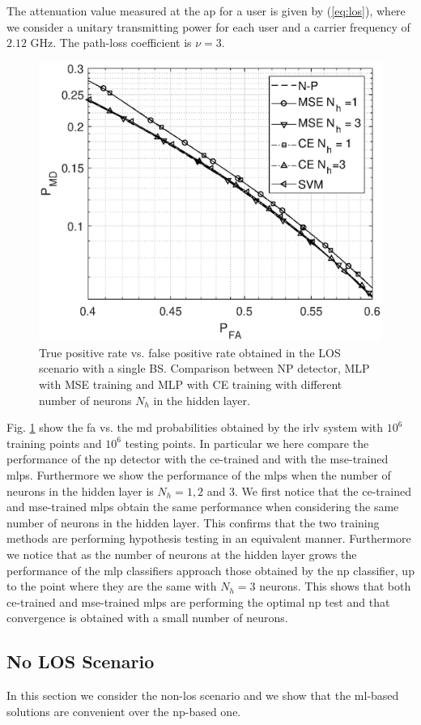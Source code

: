 \documentclass[draftcls,onecolumn,12pt]{IEEEtran}
\begin{document}
The attenuation value measured at the \ac{ap} for a user is given by (\ref{eq:los}), where we consider a unitary transmitting power for each user and a carrier frequency of $2.12$ GHz. The path-loss coefficient is $\nu=3$. 
\begin{figure}[h]
    \centering
    \includegraphics[width=0.5\columnwidth]{res_com_CE_MSE_SVM.eps}
    \caption{True positive rate vs. false positive rate obtained in the LOS scenario with a single BS. Comparison between NP detector, MLP with MSE training and MLP with CE training with different number of neurons $N_h$ in the hidden layer.}
    \label{fig:ceVSmse}
\end{figure}

Fig. \ref{fig:ceVSmse} show the \ac{fa} vs. the \ac{md} probabilities obtained by the \ac{irlv} system with $10^6$ training points and $10^6$ testing points. In particular we here compare the performance of the \ac{np} detector with the \ac{ce}-trained and with the \ac{mse}-trained \acp{mlp}. Furthermore we show the performance of the \acp{mlp} when the number of neurons in the hidden layer is $N_h=1,2 $ and $3$. We first notice that the \ac{ce}-trained and \ac{mse}-trained \acp{mlp} obtain the same performance when considering the same number of neurons in the hidden layer. This confirms that the two training methods are performing hypothesis testing in an equivalent manner. Furthermore we notice that as the number of neurons at the hidden layer grows the performance of the \ac{mlp} classifiers approach those obtained by the \ac{np} classifier, up to the point where they are the same with $N_h=3$ neurons. This shows that both \ac{ce}-trained and \ac{mse}-trained \acp{mlp} are performing the optimal \ac{np} test and that convergence is obtained with a small number of neurons.




\subsection{No LOS Scenario}\label{sec:res_nLos}
In this section we consider the non-\ac{los} scenario and we show that the \ac{ml}-based solutions are convenient over the \ac{np}-based one.
\end{document}
